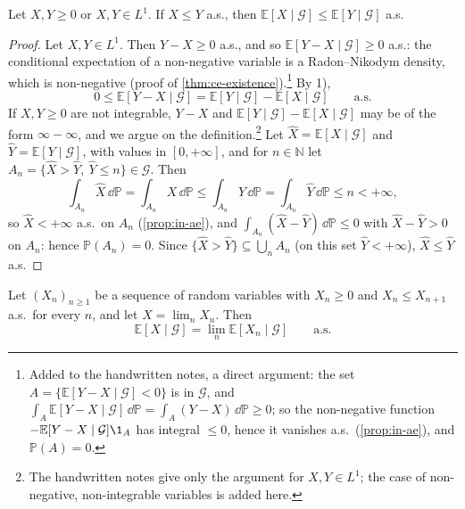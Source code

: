 \begin{proposition}\label{prop:cp-monotonicity}
Let $X,Y\ge0$ or $X,Y\in L^1$. If $X\le Y$ a.s., then
$\mathbb E[X\mid\mathcal G]\le\mathbb E[Y\mid\mathcal G]$ a.s.
\end{proposition}

\begin{proof}
Let $X,Y\in L^1$. Then $Y-X\ge0$ a.s., and so $\mathbb E[Y-X\mid\mathcal G]\ge0$ a.s.: the
conditional expectation of a non-negative variable is a Radon--Nikodym density, which is
non-negative (proof of \cref{thm:ce-existence}).\footnote{Added to the handwritten notes, a direct
argument: the set $A=\{\mathbb E[Y-X\mid\mathcal G]<0\}$ is in $\mathcal G$, and
$\int_A\mathbb E[Y-X\mid\mathcal G]\,\dd\mathbb P=\int_A(Y-X)\,\dd\mathbb P\ge0$; so the
non-negative function $-\mathbb E[Y-X\mid\mathcal G]\1_A$ has integral $\le0$, hence it vanishes
a.s.\ (\cref{prop:in-ae}), and $\mathbb P(A)=0$.} By 1),
\[
  0\le\mathbb E[Y-X\mid\mathcal G]=\mathbb E[Y\mid\mathcal G]-\mathbb E[X\mid\mathcal G]
  \qquad\text{a.s.}
\]
If $X,Y\ge0$ are not integrable, $Y-X$ and $\mathbb E[Y\mid\mathcal G]-\mathbb E[X\mid\mathcal G]$
may be of the form $\infty-\infty$, and we argue on the definition.\footnote{The handwritten notes
give only the argument for $X,Y\in L^1$; the case of non-negative, non-integrable variables is
added here.} Let $\hat X=\mathbb E[X\mid\mathcal G]$ and $\hat Y=\mathbb E[Y\mid\mathcal G]$, with
values in $[0,+\infty]$, and for $n\in\mathbb N$ let
$A_n=\{\hat X>\hat Y,\ \hat Y\le n\}\in\mathcal G$. Then
\[
  \int_{A_n}\hat X\,\dd\mathbb P=\int_{A_n}X\,\dd\mathbb P\le\int_{A_n}Y\,\dd\mathbb P
  =\int_{A_n}\hat Y\,\dd\mathbb P\le n<+\infty ,
\]
so $\hat X<+\infty$ a.s.\ on $A_n$ (\cref{prop:in-ae}), and
$\int_{A_n}(\hat X-\hat Y)\,\dd\mathbb P\le0$ with $\hat X-\hat Y>0$ on $A_n$: hence
$\mathbb P(A_n)=0$. Since $\{\hat X>\hat Y\}\subseteq\bigcup_nA_n$ (on this set $\hat Y<+\infty$),
$\hat X\le\hat Y$ a.s.
\end{proof}

\begin{theorem}\label{thm:cp-monotone-convergence}
Let $(X_n)_{n\ge1}$ be a sequence of random variables with $X_n\ge0$ and $X_n\le X_{n+1}$ a.s.\ for
every $n$, and let $X=\lim_nX_n$. Then
\[
  \mathbb E[X\mid\mathcal G]=\lim_n\mathbb E[X_n\mid\mathcal G]\qquad\text{a.s.}
\]
\end{theorem}

